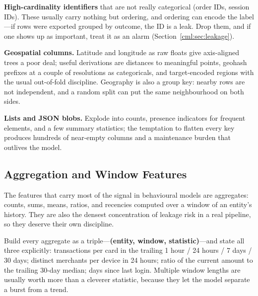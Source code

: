 \textbf{High-cardinality identifiers} that are not really categorical (order IDs, session IDs). These usually carry nothing but ordering, and ordering can encode the label---if rows were exported grouped by outcome, the ID is a leak. Drop them, and if one shows up as important, treat it as an alarm (Section~\ref{cml:sec:leakage}).

\textbf{Geospatial columns.} Latitude and longitude as raw floats give axis-aligned trees a poor deal; useful derivations are distances to meaningful points, geohash prefixes at a couple of resolutions as categoricals, and target-encoded regions with the usual out-of-fold discipline. Geography is also a group key: nearby rows are not independent, and a random split can put the same neighbourhood on both sides.

\textbf{Lists and JSON blobs.} Explode into counts, presence indicators for frequent elements, and a few summary statistics; the temptation to flatten every key produces hundreds of near-empty columns and a maintenance burden that outlives the model.

\subsection{Aggregation and Window Features}

The features that carry most of the signal in behavioural models are aggregates: counts, sums, means, ratios, and recencies computed over a window of an entity's history. They are also the densest concentration of leakage risk in a real pipeline, so they deserve their own discipline.

Build every aggregate as a triple---\textbf{(entity, window, statistic)}---and state all three explicitly: transactions per card in the trailing 1 hour / 24 hours / 7 days / 30 days; distinct merchants per device in 24 hours; ratio of the current amount to the trailing 30-day median; days since last login. Multiple window lengths are usually worth more than a cleverer statistic, because they let the model separate a burst from a trend.

